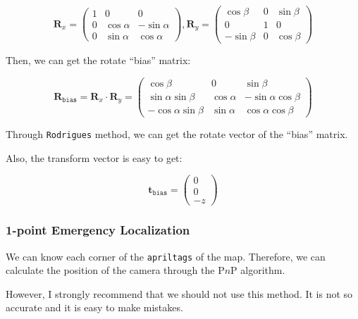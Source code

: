 \documentclass{article}
\begin{document}
\begin{equation}
  \boldsymbol{R}_x=
  \left(
    \begin{matrix}
      1 & 0 & 0 \\
      0 & \cos\alpha & -\sin\alpha \\
      0 & \sin\alpha & \cos\alpha
    \end{matrix}
  \right),
  \boldsymbol{R}_y=
  \left(
    \begin{matrix}
      \cos\beta & 0 & \sin\beta \\
      0 & 1 & 0 \\
      -\sin\beta & 0 & \cos\beta
    \end{matrix}
  \right)
\end{equation}

Then, we can get the rotate ``bias'' matrix:

\begin{equation}
  \boldsymbol{R}_{\texttt{bias}}=\boldsymbol{R}_x\cdot \boldsymbol{R}_y= \left(
    \begin{matrix}
      \cos\beta & 0 & \sin\beta \\
      \sin\alpha\sin\beta & \cos\alpha & -\sin\alpha\cos\beta \\
      -\cos\alpha\sin\beta & \sin\alpha & \cos\alpha\cos\beta
    \end{matrix}
  \right)
\end{equation}

Through \texttt{Rodrigues} method, we can get the rotate vector of the ``bias'' matrix.

Also, the transform vector is easy to get:

\begin{equation}
  \boldsymbol{t}_{\texttt{bias}}=\left(
    \begin{matrix}
      0 \\
      0 \\
      -z
    \end{matrix}
  \right)
\end{equation}

\subsubsection{1-point Emergency Localization}
We can know each corner of the \texttt{apriltags} of the map. Therefore, we can calculate the position of the camera through the P$n$P algorithm.

However, I strongly recommend that we should not use this method. It is not so accurate and it is easy to make mistakes.
\end{document}
